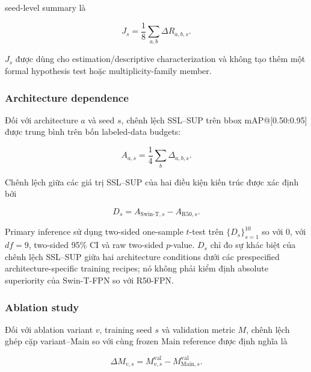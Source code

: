 \documentclass[pdflatex,sn-mathphys-num]{sn-jnl}%
\theoremstyle{thmstyleone}%
\theoremstyle{thmstyletwo}%
\theoremstyle{thmstylethree}%
\begin{document}
seed-level summary là

\begin{equation}
J_s
=
\frac{1}{8}
\sum_{a,b}
\Delta R_{a,b,s}.
\label{eq:far_seed_effect}
\end{equation}

\(J_s\) được dùng cho estimation/descriptive characterization và không tạo
thêm một formal hypothesis test hoặc multiplicity-family member.

\subsubsection{Architecture dependence}
\label{subsubsec:sq3_architecture_dependence}

Đối với architecture \(a\) và seed \(s\), chênh lệch SSL--SUP trên bbox mAP@[0.50:0.95] được trung bình
trên bốn labeled-data budgets:

\begin{equation}
A_{a,s}
=
\frac{1}{4}
\sum_b
\Delta_{a,b,s}.
\label{eq:architecture_seed_gain}
\end{equation}

Chênh lệch giữa các giá trị SSL--SUP của hai điều kiện kiến trúc được xác định bởi

\begin{equation}
D_s
=
A_{\mathrm{Swin\text{-}T},s}
-
A_{\mathrm{R50},s}.
\label{eq:architecture_difference_effect}
\end{equation}

Primary inference sử dụng two-sided one-sample \(t\)-test trên
\(\{D_s\}_{s=1}^{10}\) so với \(0\), với \(df=9\), two-sided 95\% CI và
raw two-sided \(p\)-value. \(D_s\) chỉ đo sự khác biệt của chênh lệch SSL--SUP
giữa hai architecture conditions dưới các prespecified
architecture-specific training recipes; nó không phải kiểm định absolute
superiority của Swin-T-FPN so với R50-FPN.

\subsubsection{Ablation study}
\label{subsubsec:exploratory_analyses}

Đối với ablation variant \(v\), training seed \(s\) và validation metric
\(M\), chênh lệch ghép cặp variant--Main so với cùng frozen Main reference được định nghĩa là

\begin{equation}
\Delta M_{v,s}
=
M^{\mathrm{val}}_{v,s}
-
M^{\mathrm{val}}_{\mathrm{Main},s}.
\label{eq:ablation_paired_effect}
\end{equation}
\end{document}
